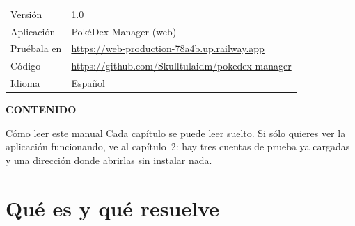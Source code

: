 \documentclass[11pt,a4paper]{article}
\begin{document}
\begin{titlepage}
\vspace{0.5cm}
\noindent
\begin{minipage}{\textwidth}
\sffamily\footnotesize
\setlength{\tabcolsep}{0pt}
\begin{tabular}{@{}p{3.3cm}p{9.5cm}@{}}
{\color{coverMuted}Versión} & {\color{paper}1.0} \\[3pt]
{\color{coverMuted}Aplicación} & {\color{paper}PokéDex Manager (web)} \\[3pt]
{\color{coverMuted}Pruébala en} & {\color{paper}\url{https://web-production-78a4b.up.railway.app}} \\[3pt]
{\color{coverMuted}Código} & {\color{paper}\url{https://github.com/Skulltulaidm/pokedex-manager}} \\[3pt]
{\color{coverMuted}Idioma} & {\color{paper}Español} \\
\end{tabular}
\end{minipage}

\vspace{0.9cm}
\end{titlepage}

\thispagestyle{plain}
\noindent
{\sffamily\bfseries\fontsize{9.5}{11}\selectfont\color{pokeRed}%
 \MakeUppercase{Contenido}}

\vspace{0.25cm}
\noindent{\color{pokeRed}\rule{3.2cm}{2.2pt}}
\vspace{0.9cm}

\setcounter{tocdepth}{1}
\makeatletter{}\makeatother

\vspace{1.2cm}
\begin{notabox}{Cómo leer este manual}
Cada capítulo se puede leer suelto. Si sólo quieres ver la aplicación
funcionando, ve al capítulo~2: hay tres cuentas de prueba ya cargadas y una
dirección donde abrirlas sin instalar nada.
\end{notabox}

\clearpage

\section{Qué es y qué resuelve}
\end{document}

